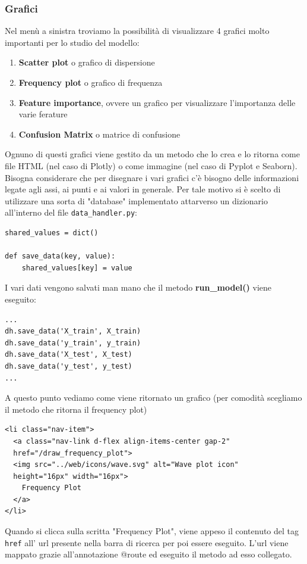 \documentclass{article}
\begin{document}
\subsubsection{Grafici}
Nel menù a sinistra troviamo la possibilità di visualizzare 4 grafici molto importanti per lo studio del modello:
    \begin{enumerate}
        \item \textbf{Scatter plot} o grafico di dispersione 
        \item \textbf{Frequency plot} o grafico di frequenza
        \item \textbf{Feature importance}, ovvere un grafico per visualizzare l'importanza delle varie ferature
        \item \textbf{Confusion Matrix} o matrice di confusione
    \end{enumerate}
Ognuno di questi grafici viene gestito da un metodo che lo crea e lo ritorna come file HTML (nel caso di Plotly) o come immagine (nel caso di Pyplot e Seaborn). Bisogna considerare che per disegnare i vari grafici c'è bisogno delle informazioni legate agli assi, ai punti e ai valori in generale. Per tale motivo si è scelto di utilizzare una sorta di "database" implementato attarverso un dizionario all'interno del file \texttt{data\_handler.py}:
\begin{verbatim}
shared_values = dict()

def save_data(key, value):
    shared_values[key] = value
\end{verbatim}
I vari dati vengono salvati man mano che il metodo \textbf{run\_model()} viene eseguito:
\begin{verbatim}
...
dh.save_data('X_train', X_train)
dh.save_data('y_train', y_train)
dh.save_data('X_test', X_test)
dh.save_data('y_test', y_test)
...
\end{verbatim}
A questo punto vediamo come viene ritornato un grafico (per comodità scegliamo il metodo che ritorna il frequency plot)
\newpage
\begin{verbatim}
<li class="nav-item">
  <a class="nav-link d-flex align-items-center gap-2" 
  href="/draw_frequency_plot">
  <img src="../web/icons/wave.svg" alt="Wave plot icon" 
  height="16px" width="16px">
    Frequency Plot
  </a>
</li>
\end{verbatim}
Quando si clicca sulla scritta "Frequency Plot", viene appeso il contenuto del tag \texttt{href} all' url presente nella barra di ricerca per poi essere eseguito. L'url viene mappato grazie all'annotazione @route ed eseguito il metodo ad esso collegato.
\end{document}
